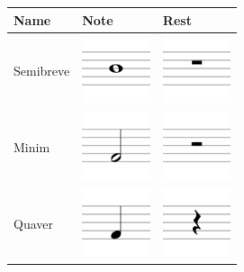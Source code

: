             \begin{table}[h]
                \centering
                \begin{tabular}{| >{\centering\arraybackslash}m{1in} | >{\centering\arraybackslash}m{1in} | >{\centering\arraybackslash}m{1in} |}
                    \hline
                    Name & Note & Rest \\ \hline
                    Semibreve& 
                            \includegraphics[width=20mm]{./assets/whole.png}
                            &
                            \includegraphics[width=20mm]{./assets/wholerest.png} \\ \hline
                    Minim& 
                            \includegraphics[width=20mm]{./assets/half.png}
                            &
                            \includegraphics[width=20mm]{./assets/halfrest.png} \\ \hline
                    Quaver&
                            \includegraphics[width=20mm]{./assets/4er.png}
                            &
                            \includegraphics[width=20mm]{./assets/4errest.png} \\ \hline

\end{tabular}
\end{table}
